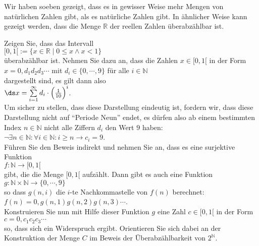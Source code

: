 \remark
Wir haben soeben gezeigt, dass es in gewisser Weise mehr Mengen von nat\"{u}rlichen Zahlen gibt, als es
nat\"{u}rliche Zahlen gibt.  In \"{a}hnlicher Weise kann gezeigt werden, dass die Menge $\mathbb{R}$ der reellen
Zahlen \"{u}berabz\"{a}hlbar ist.  

\exercise
Zeigen Sie, dass das Intervall
\\[0.2cm]
\hspace*{1.3cm}
$[0,1[ := \{ x \in \mathbb{R} \mid 0 \leq x \wedge x < 1 \}$ 
\\[0.2cm]
\"{u}berabz\"{a}hlbar ist.  Nehmen Sie dazu an, dass die Zahlen $x \in [0,1[$ in der Form
\\[0.2cm]
\hspace*{1.3cm}
$ x = 0, d_1 d_2 d_3 \cdots$ \quad mit $d_i \in \{ 0, \cdots, 9 \}$  f\"{u}r alle $i \in \mathbb{N}$
\\[0.2cm]
dargestellt sind, es gilt dann also
\\[0.2cm]
\hspace*{1.3cm}
$\ds x = \sum\limits_{i=1}^\infty d_i \cdot \Bigl(\frac{1}{10}\Bigr)^{i}$.
\\[0.2cm]
Um sicher zu stellen, dass diese Darstellung eindeutig ist, fordern wir, dass diese Darstellung
nicht auf ``Periode Neun'' endet, es d\"{u}rfen also ab einem bestimmten Index $n \in \mathbb{N}$ nicht
alle Ziffern $d_i$ den Wert $9$ haben:
\\[0.2cm]
\hspace*{1.3cm}
$\neg \exists n \in \mathbb{N}: \forall i \in \mathbb{N}: i \geq n \rightarrow c_i = 9$.
\\[0.2cm]
F\"{u}hren Sie den Beweis indirekt und nehmen Sie an, dass es eine surjektive Funktion 
\\[0.2cm]
\hspace*{1.3cm}
$f: \mathbb{N} \rightarrow [0,1[$
\\[0.2cm]
gibt, die die Menge $[0,1[$ aufz\"{a}hlt.  Dann gibt es auch eine Funktion
\\[0.2cm]
\hspace*{1.3cm}
$g: \mathbb{N} \times \mathbb{N} \rightarrow \{0, \cdots, 9\}$
\\[0.2cm]
so dass $g(n,i)$ die $i$-te Nachkommastelle von $f(n)$ berechnet:
\\[0.2cm]
\hspace*{1.3cm}
$f(n) = 0,g(n,1) g(n,2) g(n,3) \cdots$.
\\[0.2cm]
Konstruieren Sie nun mit Hilfe dieser Funktion $g$ eine Zahl $c \in [0,1[$ in der Form
\\[0.2cm]
\hspace*{1.3cm}
$c = 0,c_1c_2c_3 \cdots$
\\[0.2cm]
so, dass sich ein Widerspruch ergibt.  Orientieren Sie sich dabei an der Konstruktion der Menge $C$ im
Beweis der \"{U}berabz\"{a}hlbarkeit von $2^\mathbb{N}$.  \exend

